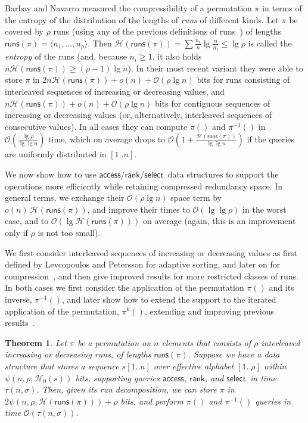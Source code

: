 \documentclass[11pt]{article}
\newtheorem{theorem}{Theorem}
\providecommand{\pii}{\ensuremath{\pi^{-1}}}
\newcommand{\Oh}[1]
    {\ensuremath{\mathcal{O}\left( {#1} \right)}}
\newcommand{\access}
    {\ensuremath{\mathsf{access}}}
\newcommand{\rank}
    {\ensuremath{\mathsf{rank}}}
\newcommand{\select}
    {\ensuremath{\mathsf{select}}}
\newcommand{\runs}
    {\ensuremath{\mathsf{runs}}}
\newcommand{\HH}{\mathcal{H}}
\newcommand{\Ho}{\HH_0}
\begin{document}
Barbay and Navarro \cite{BN09} measured the compressibility of a permutation 
$\pi$ in terms of the entropy of the distribution of the lengths of {\em runs} 
of different kinds. Let $\pi$ be covered by $\rho$ runs (using any of the 
previous definitions of runs~\cite{LP94,BN09,Meh79})
of lengths $\runs(\pi) = \langle n_1, \ldots, n_\rho\rangle$.
Then $\HH(\runs (\pi)) = \sum \frac{n_i}{n}\lg\frac{n}{n_i} \le
\lg\rho$ is called the {\em entropy} of the runs (and, because $n_i
\ge 1$, it also holds $n\HH(\runs(\pi)) \ge (\rho-1)\lg n$).
In their most recent variant \cite{BN11} they were able to store $\pi$ in
$2n\HH(\runs(\pi))+o(n)+ \Oh{\rho\lg n}$ 
bits for runs consisting of interleaved sequences of increasing or decreasing
values, and $n\HH(\runs(\pi))+o(n)+\Oh{\rho\lg n}$ 
bits for contiguous sequences of increasing or decreasing values (or,
alternatively, interleaved sequences of consecutive values). 
In all cases they can compute $\pi()$ and $\pi^{-1}()$ in 
$\Oh{\frac{\lg \rho}{\lg\lg n}}$ time, which on average drops to 
$\Oh{1+\frac{\HH(\runs(\pi))}{\lg\lg n}}$ if the queries are 
uniformly distributed in $[1..n]$.

We now show how to use \access/\rank/\select\ data structures to support the 
operations more efficiently while retaining compressed redundancy space.
In general terms, we exchange their $\Oh{\rho\lg n}$ space term by 
$o(n)\,\HH(\runs(\pi))$, and improve their times to $\Oh{\lg\lg\rho}$ in the
worst case, and to $\Oh{\lg\HH(\runs(\pi))}$ on average (again, this is an
improvement only if $\rho$ is not too small).

We first consider interleaved sequences of
increasing or decreasing values as first defined by
Levcopoulos and Petersson \cite{LP94} for adaptive
sorting, and later on for compression~\cite{BN09}, and then give
improved results for more restricted classes of runs.
In both cases we first consider the application of the permutation
$\pi()$ and its inverse, $\pii()$, and later show how to extend the
support to the iterated application of the permutation, $\pi^k()$,
extending and improving previous results~\cite{MRRR03}.

\begin{theorem} \label{thm:runs}
  Let $\pi$ be a permutation on $n$ elements that consists of $\rho$
  interleaved increasing or decreasing runs, of lengths $\runs (\pi)$.
  Suppose we have a data structure that stores a sequence $s[1..n]$
  over effective alphabet $[1..\rho]$ within $\psi(n,\rho,\Ho(s))$ bits,
  supporting queries \access, \rank, and \select\ in time $\tau(n,\sigma)$.
Then, given its run decomposition, we can store $\pi$ in 
  $2\psi(n,\rho,\HH(\runs(\pi))) + \rho$ bits,
  and perform $\pi()$ and $\pii()$ queries in time $\Oh{\tau(n,\sigma)}$.
\end{theorem}
\end{document}
